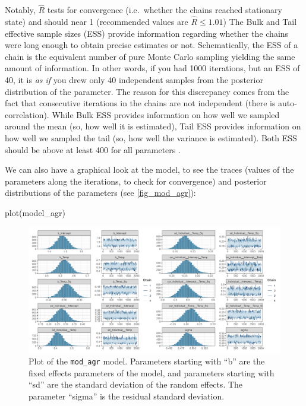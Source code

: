 \documentclass[a4paper,12pt,twoside]{article}
\begin{document}
Notably, $\hat{R}$ tests for convergence (i.e.\ whether the chains reached stationary state) and should near 1 (recommended values are $\hat{R} \leq 1.01$)
The Bulk and Tail effective sample sizes (ESS) provide information regarding whether the chains were long enough to obtain precise estimates or not.
Schematically, the ESS of a chain is the equivalent number of pure Monte Carlo sampling yielding the same amount of information.
In other words, if you had 1000 iterations, but an ESS of 40, it is \textit{as if} you drew only 40 independent samples from the posterior distribution of the parameter.
The reason for this discrepancy comes from the fact that consecutive iterations in the chains are not independent (there is auto-correlation).
While Bulk ESS provides information on how well we sampled around the mean (so, how well it is estimated), Tail ESS provides information on how well we sampled the tail (so, how well the variance is estimated).
Both ESS should be above at least 400 for all parameters \autocite{vehtari_ranknormalization_2021}.

We can also have a graphical look at the model, to see the traces (values of the parameters along the iterations, to check for convergence) and posterior distributions of the parameters (see \autoref{fig_mod_agr}):
\begin{Rinput}
plot(model_agr)
\end{Rinput}

\begin{figure}[t!h!]
  \includegraphics[width = \textwidth]{Aggressiveness_discrete_model.png}
  \caption{Plot of the \texttt{mod\_agr} model. Parameters starting with ``b'' are the fixed effects parameters of the model, and parameters starting with ``sd'' are the standard deviation of the random effects. The parameter ``sigma'' is the residual standard deviation.}
  \label{fig_mod_agr}
\end{figure}
\end{document}
